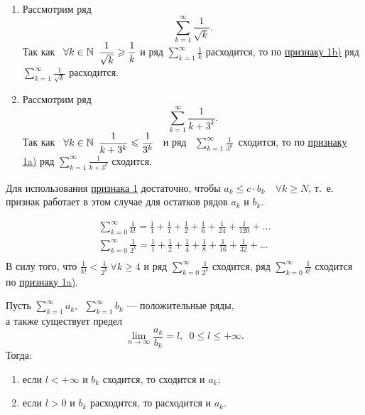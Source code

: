 \documentclass[../../main.tex]{subfiles}
\begin{document}
\begin{examples}

~

\begin{enumerate}
\item
	Рассмотрим ряд
	\[
		 \sum\limits_{k = 1}^\infty\frac{1}{\sqrt{k}}
	.\]
	Так как \  $\forall k \in \mathbb{N} \enspace
	 \dfrac{1}{\sqrt{k}} \geqslant \dfrac{1}{k}$ и ряд 
	 $\displaystyle\sum\limits_{k = 1}^\infty \frac{1}{k}$ расходится,
	то по \hyperref[lec26:comp_test_1]{признаку  1\textdegree b)} ряд
	$\displaystyle\sum\limits_{k = 1}^\infty\frac{1}{\sqrt{k}}$ расходится.
\item
	Рассмотрим ряд
	\[
		 \sum\limits_{k = 1}^\infty\frac{1}{k + 3^k}
	.\]
	Так как \  $\forall k \in \mathbb{N} \enspace
	 \dfrac{1}{{k + 3^k}} \leqslant \dfrac{1}{3^k}$ \  и ряд 
	\ $\displaystyle\sum\limits_{k = 1}^\infty \frac{1}{3^k}$\   сходится,
	то по \hyperref[lec26:comp_test_1]{признаку  1\textdegree a)} ряд
	$\displaystyle \sum\limits_{k = 1}^\infty\frac{1}{k + 3^k}$ сходится.
\end{enumerate}
\end{examples}
\begin{rem}
Для использования \hyperref[lec26:comp_test_1]{признака  1\textdegree} 
достаточно, чтобы $a_k \leq c\cdot b_k\quad \forall k\geq N$, т.~е.
признак работает в этом случае для остатков рядов $a_k$ и $b_k$. 
 \end{rem}
\begin{example}
\begin{gather*}
	\sum\limits_{k = 0}^\infty\frac{1}{k!} = \frac{1}{1} + 
	\frac{1}{1} +  \frac{1}{2} +  \frac{1}{6} +
	\frac{1}{24} +  \frac{1}{120} + \ldots\\
	\sum\limits_{k = 0}^\infty\frac{1}{2^k} = \frac{1}{1} + 
	\frac{1}{2} +  \frac{1}{4} +  \frac{1}{8} +
	\frac{1}{16} +  \frac{1}{32} + \ldots\\
\end{gather*}
	В силу того, что
	$\displaystyle\frac{1}{k!} < \frac{1}{2^k} \  \forall k \geq 4$
	и ряд $\displaystyle\sum\limits_{k = 0}^\infty\frac{1}{2^k}$ сходится,
	ряд $\displaystyle\sum\limits_{k = 0}^\infty\frac{1}{k!}$ сходится по
	 \hyperref[lec26:comp_test_1]{признаку  1\textdegree a)}.
\end{example}
  \begin{thm}
 	\label{lec26:comp_test_2}
 	Пусть $\sum\limits_{k = 1}^\infty a_k,
 	\enspace \sum\limits_{k = 1}^\infty b_k$
 	 --- положительные ряды,\\ 
 	а также существует предел
 	\[
 	\lim\limits_{n \to \infty}\frac{a_k}{b_k} = l,\enspace 0 \leq l \leq +\infty
 	.\]
	Тогда:
	\begin{enumerate}[label={\alph*)}]
	\item если $l < +\infty$ и $b_k$ сходится, то сходится и $a_k$;
	\item если $l > 0$ и $b_k$ расходится, то расходится и $a_k$.
	\end{enumerate}
 \end{thm}
\end{document}
